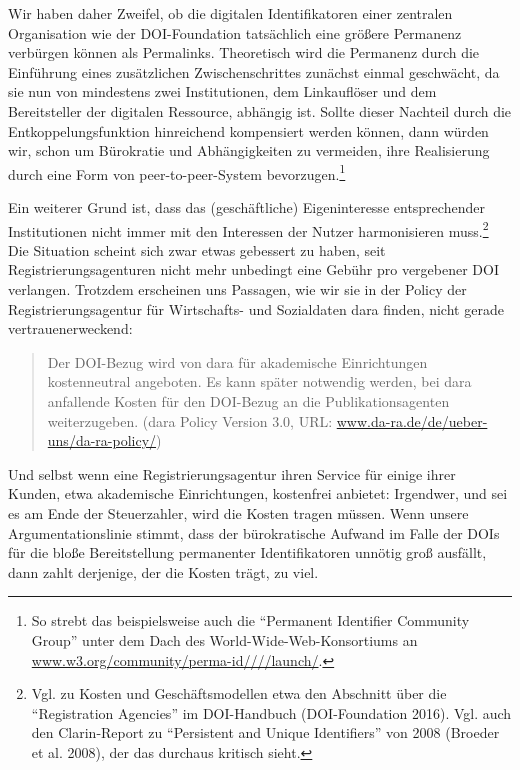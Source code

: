 \documentclass[12pt, a4paper]{article}
\begin{document}
Wir haben daher Zweifel, ob die digitalen Identifikatoren einer
zentralen Organisation wie der DOI-Foundation tatsächlich eine größere
Permanenz verbürgen können als Permalinks. Theoretisch
wird die Permanenz durch die Einführung eines zusätzlichen
Zwischenschrittes zunächst einmal geschwächt, da sie nun von
mindestens zwei Institutionen, dem Linkauflöser und dem Bereitsteller
der digitalen Ressource, abhängig ist. Sollte dieser Nachteil durch
die Entkoppelungsfunktion hinreichend kompensiert werden können, dann
würden wir, schon um Bürokratie und Abhängigkeiten zu vermeiden, ihre
Realisierung durch eine Form von peer-to-peer-System
bevorzugen.\footnote{So strebt das beispielsweise auch die "`Permanent
  Identifier Community Group"' unter dem Dach des
  World-Wide-Web-Konsortiums an
  \href{http://www.w3.org/community/perma-id/2013/02/16/launch/}{www.w3.org/\-community/\-perma-id////\-launch/}.}

Ein weiterer Grund ist, dass das (geschäftliche) Eigeninteresse
entsprechender Institutionen nicht immer mit den Interessen der Nutzer
harmonisieren muss.\footnote{Vgl. zu Kosten und Geschäftsmodellen etwa
  den Abschnitt über die "`Registration Agencies"' im DOI-Handbuch
  (DOI-Foundation 2016). Vgl. auch den Clarin-Report zu "`Persistent
  and Unique Identifiers"' von 2008 (Broeder et al. 2008), der das
  durchaus kritisch sieht.} Die Situation scheint sich zwar
etwas gebessert zu haben, seit Registrierungsagenturen nicht mehr unbedingt
eine Gebühr pro vergebener DOI verlangen. Trotzdem erscheinen uns Passagen, wie
wir sie in der Policy der Registrierungsagentur für Wirtschafts- und
Sozialdaten da\textbar ra finden, nicht gerade vertrauenerweckend:

\begin{quote}
  Der DOI-Bezug wird von da\textbar ra für akademische Einrichtungen
  kostenneutral angeboten. Es kann später notwendig werden, bei
  da\textbar ra anfallende Kosten für den DOI-Bezug an die
  Publikationsagenten weiterzugeben. (da\textbar ra Policy Version
  3.0, URL:
  \href{http://www.da-ra.de/de/ueber-uns/da-ra-policy/}{www.da-ra.de/\-de/\-ueber-uns/\-da-ra-policy/})
\end{quote}

Und selbst wenn eine Registrierungsagentur ihren Service für einige
ihrer Kunden, etwa akademische Einrichtungen, kostenfrei anbietet:
Irgendwer, und sei es am Ende der Steuerzahler, wird die Kosten tragen
müssen. Wenn unsere Argumentationslinie stimmt, dass der bürokratische
Aufwand im Falle der DOIs für die bloße Bereitstellung permanenter
Identifikatoren unnötig groß ausfällt, dann zahlt derjenige, der die
Kosten trägt, zu viel.
\end{document}
